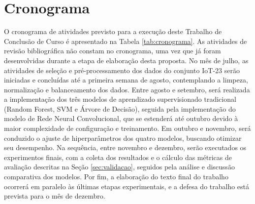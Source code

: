\section{Cronograma}\label{sec:cronograma}

O cronograma de atividades previsto para a execução deste Trabalho de Conclusão de Curso é apresentado na Tabela \ref{tab:cronograma}. As atividades de revisão bibliográfica não constam no cronograma, uma vez que já foram desenvolvidas durante a etapa de elaboração desta proposta.
No mês de julho, as atividades de seleção e pré-processamento dos dados do conjunto IoT-23 serão iniciadas e concluídas até a primeira semana de agosto, contemplando a limpeza, normalização e balanceamento dos dados. Entre agosto e setembro, será realizada a implementação dos três modelos de aprendizado supervisionado tradicional (Random Forest, SVM e Árvore de Decisão), seguida pela implementação do modelo de Rede Neural Convolucional, que se estenderá até outubro devido à maior complexidade de configuração e treinamento. Em outubro e novembro, será conduzido o ajuste de hiperparâmetros dos quatro modelos, buscando otimizar seu desempenho. Na sequência, entre novembro e dezembro, serão executados os experimentos finais, com a coleta dos resultados e o cálculo das métricas de avaliação descritas na Seção \ref{sec:validacao}, seguidos pela análise e discussão comparativa dos modelos. Por fim, a elaboração do texto final do trabalho ocorrerá em paralelo às últimas etapas experimentais, e a defesa do trabalho está prevista para o mês de dezembro.

